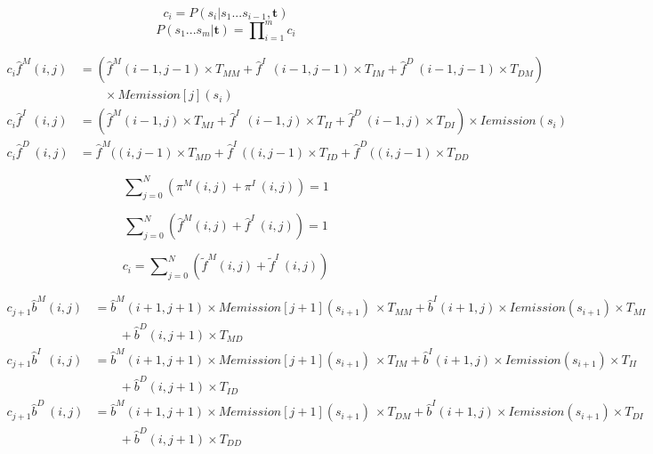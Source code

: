 \documentclass[10pt]{article}
\begin{document}
    \begin{equation}
      c_{i} = P(s_{i} | s_1...s_{i-1},\mathbf{t})
    \end{equation}
    \begin{equation}
      P(s_1...s_m | \mathbf{t}) = \prod\nolimits_{i=1}^{m} c_i
    \end{equation}

    \begin{align}
      c_{i} \widehat{f}^{M}(i, j) &= (\widehat{f}^{M}(i-1, j-1) \times T_{MM}  + \widehat{f}^{I\;\;}(i-1, j-1) \times T_{IM} + \widehat{f}^{D\;}(i-1, j-1) \times T_{DM}) \\ 
        &\qquad\times Memission[j](s_{i}) \nonumber \\
      c_{i} \widehat{f}^{I\;\;}(i, j) &= (\widehat{f}^{M}(i-1, j) \times T_{MI}  + \widehat{f}^{I\;\;}(i-1, j) \times T_{II} + \widehat{f}^{D\;}(i-1, j) \times T_{DI}) \times Iemission(s_{i}) \\
      c_{i} \widehat{f}^{D\;}(i, j) &= \widehat{f}^{M}((i, j-1) \times T_{MD}  + \widehat{f}^{I\;\;}((i, j-1) \times T_{ID} + \widehat{f}^{D\;}((i, j-1) \times T_{DD}
    \end{align}

    \begin{equation}
      \sum\nolimits_{j=0}^{N} \left( \pi^{M}(i, j) + \pi^{I\;}(i, j) \right) = 1
    \end{equation}

    \begin{equation}
      \sum\nolimits_{j=0}^{N} \left( \widehat{f}^{M}(i, j) + \widehat{f}^{I\;}(i, j) \right) = 1
    \end{equation}

    \begin{equation}
      c_{i} = \sum\nolimits_{j=0}^{N} \left( \widetilde{f}^{M}(i, j) + \widetilde{f}^{I\;}(i, j) \right)
    \end{equation}

    \begin{equation}
    \begin{aligned}
      c_{j+1} \widehat{b}^{M}(i, j) &= \widehat{b}^M(i+1, j+1) \times Memission[j+1](s_{i+1}) \
        \times T_{MM} + \widehat{b}^{I}(i+1, j) \times Iemission(s_{i+1}) \times T_{MI} \\
                 &\qquad+ \widehat{b}^{D}(i, j+1) \times T_{MD} \\
      c_{j+1} \widehat{b}^{I\;\;}(i, j) &= \widehat{b}^M(i+1, j+1) \times Memission[j+1](s_{i+1}) \
        \times T_{IM} + \widehat{b}^{I}(i+1, j) \times Iemission(s_{i+1}) \times T_{II} \\
                  &\qquad+ \widehat{b}^{D}(i, j+1) \times T_{ID} \\
      c_{j+1} \widehat{b}^{D\;}(i, j) &= \widehat{b}^M(i+1, j+1) \times Memission[j+1](s_{i+1}) \
        \times T_{DM} + \widehat{b}^{I}(i+1, j) \times Iemission(s_{i+1}) \times T_{DI} \\
                  &\qquad+ \widehat{b}^{D}(i, j+1) \times T_{DD}
    \end{aligned} 
    \end{equation}
\end{document}
